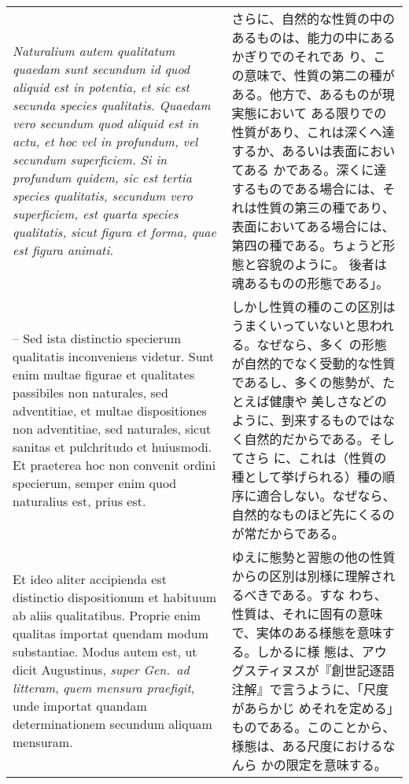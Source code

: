 \documentclass[10pt]{jsarticle} %
\begin{document}
\begin{longtable}{p{21em}p{21em}}
\\



{\itshape Naturalium autem qualitatum
quaedam sunt secundum id quod aliquid est in potentia, et sic est
secunda species qualitatis. Quaedam vero secundum quod aliquid est in
actu, et hoc vel in profundum, vel secundum superficiem. Si in
profundum quidem, sic est tertia species qualitatis, secundum vero
superficiem, est quarta species qualitatis, sicut figura et forma,
quae est figura animati.} 


&

さらに、自然的な性質の中のあるものは、能力の中にあるかぎりでのそれであ
り、この意味で、性質の第二の種がある。他方で、あるものが現実態において
ある限りでの性質があり、これは深くへ達するか、あるいは表面においてある
かである。深くに達するものである場合には、それは性質の第三の種であり、
表面においてある場合には、第四の種である。ちょうど形態と容貌のように。
後者は魂あるものの形態である」。


\\



-- Sed ista distinctio specierum qualitatis
inconveniens videtur. Sunt enim multae figurae et qualitates
passibiles non naturales, sed adventitiae, et multae dispositiones non
adventitiae, sed naturales, sicut sanitas et pulchritudo et
huiusmodi. 
Et praeterea hoc non convenit ordini specierum, semper enim
quod naturalius est, prius est. 


&

しかし性質の種のこの区別はうまくいっていないと思われる。なぜなら、多く
の形態が自然的でなく受動的な性質であるし、多くの態勢が、たとえば健康や
美しさなどのように、到来するものではなく自然的だからである。そしてさら
に、これは（性質の種として挙げられる）種の順序に適合しない。なぜなら、
自然的なものほど先にくるのが常だからである。


\\


Et ideo aliter accipienda est
distinctio dispositionum et habituum ab aliis qualitatibus. Proprie
enim qualitas importat quendam modum substantiae. Modus autem est, ut
dicit Augustinus, {\itshape super Gen.~ad litteram}, {\itshape quem mensura praefigit}, unde
importat quandam determinationem secundum aliquam mensuram. 


&

ゆえに態勢と習態の他の性質からの区別は別様に理解されるべきである。すな
わち、性質は、それに固有の意味で、実体のある様態を意味する。しかるに様
態は、アウグスティヌスが『創世記逐語注解』で言うように、「尺度があらかじ
めそれを定める」ものである。このことから、様態は、ある尺度におけるなんら
かの限定を意味する。


\end{longtable}
\end{document}
